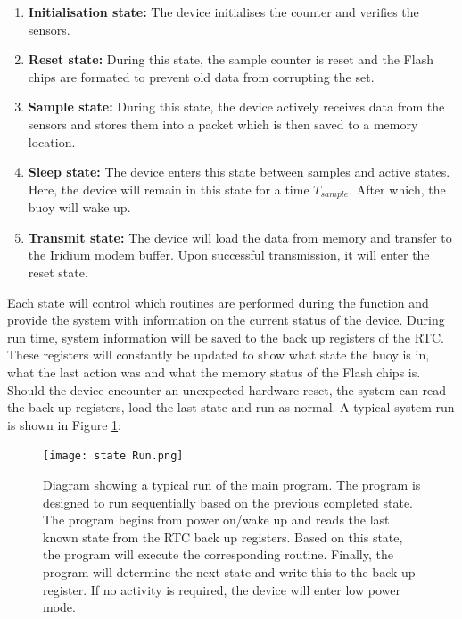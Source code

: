 \begin{enumerate}
	\item \textbf{Initialisation state:} The device initialises the counter and verifies the sensors.
	\item \textbf{Reset state:} During this state, the sample counter is reset and the Flash chips are formated to prevent old data from corrupting the set.
	\item \textbf{Sample state:} During this state, the device actively receives data from the sensors and stores them into a packet which is then saved to a memory location.
	\item \textbf{Sleep state:} The device enters this state between samples and active states. Here, the device will remain in this state for a time $T_{sample}$. After which, the buoy will wake up.
	\item \textbf{Transmit state:} The device will load the data from memory and transfer to the Iridium modem buffer. Upon successful transmission, it will enter the reset state.
\end{enumerate}

Each state will control which routines are performed during the function and provide the system with information on the current status of the device. During run time, system information will be saved to the back up registers of the RTC. These registers will constantly be updated to show what state the buoy is in, what the last action was and what the memory status of the Flash chips is. Should the device encounter an unexpected hardware reset, the system can read the back up registers, load the last state and run as normal. A typical system run is shown in Figure \ref{fig:state_run}:

\begin{figure}[H]
	\centering
	\texttt{[image: state Run.png]}
	\caption{Diagram showing a typical run of the main program. The program is designed to run sequentially based on the previous completed state. The program begins from power on/wake up and reads the last known state from the RTC back up registers. Based on this state, the program will execute the corresponding routine. Finally, the program will determine the next state and write this to the back up register. If no activity is required, the device will enter low power mode.}
	\label{fig:state_run}
\end{figure}

